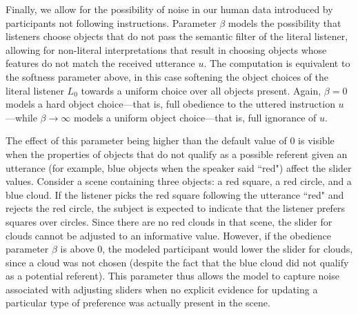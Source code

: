 \documentclass[11pt,a4paper]{article}
\begin{document}


Finally, we allow for the possibility of noise in our human data introduced by participants not following instructions.
Parameter $\beta$ models the possibility that listeners choose objects that do not pass the semantic filter of the literal listener, allowing for non-literal interpretations that result in choosing objects whose features do not match the received utterance $u$. 
The computation is equivalent to the softness parameter above, in this case softening the object choices of the literal listener $L_0$ towards a uniform choice over all objects present. 
Again, $\beta=0$ models a hard object choice---that is, full obedience to the uttered instruction $u$---while $\beta \rightarrow \infty$ models a uniform object choice---that is, full ignorance of $u$. 

The effect of this parameter being higher than the default value of $0$ is visible when the properties of objects that do not qualify as a possible referent given an utterance (for example, blue objects when the speaker said ``red") affect the slider values. Consider a scene containing three objects: a red square, a red circle, and a blue cloud. If the listener picks the red square following the utterance ``red" and rejects the red circle, the subject is expected to indicate that the listener prefers squares over circles. Since there are no red clouds in that scene, the slider for clouds cannot be adjusted to an informative value. However, if the obedience parameter $\beta$ is above $0$, the modeled participant would lower the slider for clouds, since a cloud was not chosen (despite the fact that the blue cloud did not qualify as a potential referent).
This parameter thus allows the model to capture noise associated with adjusting sliders when no explicit evidence for updating a particular type of preference was actually present in the scene.
\end{document}

